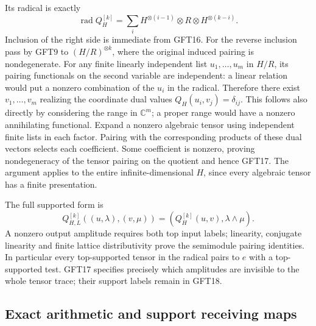 Its radical is exactly
\begin{equation}\tag{GFT17}
 \operatorname{rad}Q_H^{[k]}
      =\sum_i H^{\otimes(i-1)}\otimes R\otimes H^{\otimes(k-i)}.
\end{equation}
Inclusion of the right side is immediate from GFT16. For the
reverse inclusion pass by GFT9 to $(H/R)^{\otimes k}$, where
the original induced pairing is nondegenerate. For any finite
linearly independent list $u_1,\ldots,u_m$ in $H/R$, its pairing
functionals on the second variable are independent: a linear
relation would put a nonzero combination of the $u_i$ in the
radical. Therefore there exist $v_1,\ldots,v_m$ realizing the
coordinate dual values $Q_H(u_i,v_j)=\delta_{ij}$. This follows
also directly by considering the range in $\mathbb C^m$; a
proper range would have a nonzero annihilating functional.
Expand a nonzero algebraic tensor using independent finite lists
in each factor. Pairing with the corresponding products of
these dual vectors selects each coefficient. Some coefficient
is nonzero, proving nondegeneracy of the tensor pairing on the
quotient and hence GFT17. The argument applies to the entire
infinite-dimensional $H$, since every algebraic tensor has a
finite presentation.

The full supported form is
\begin{equation}\tag{GFT18}
 Q_{H,L}^{[k]}((u,\lambda),(v,\mu))
             =(Q_H^{[k]}(u,v),\lambda\wedge\mu).
\end{equation}
A nonzero output amplitude requires both top input labels;
linearity, conjugate linearity and finite lattice distributivity
prove the semimodule pairing identities. In particular every
top-supported tensor in the radical pairs to $e$ with a
top-supported test. GFT17 specifies precisely which amplitudes
are invisible to the whole tensor trace; their support labels
remain in GFT18.

\subsection{Exact arithmetic and support receiving maps}

